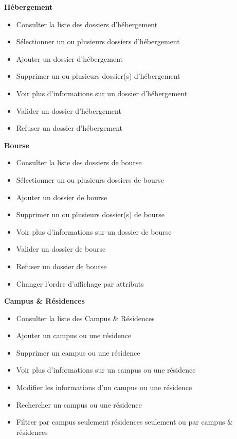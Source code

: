     \textbf{Hébergement}
    \begin{itemize}
        \item Consulter la liste des dossiers d'hébergement
        \item Sélectionner un ou plusieurs dossiers d'hébergement
        \item Ajouter un dossier d'hébergement
        \item Supprimer un ou plusieurs dossier(s) d'hébergement
        \item Voir plus d'informations sur un dossier d'hébergement
        \item Valider un dossier d'hébergement
        \item Refuser un dossier d'hébergement \\
    \end{itemize}

    \textbf{Bourse}
    \begin{itemize}
        \item Consulter la liste des dossiers de bourse
        \item Sélectionner un ou plusieurs dossiers de bourse
        \item Ajouter un dossier de bourse
        \item Supprimer un ou plusieurs dossier(s) de bourse
        \item Voir plus d'informations sur un dossier de bourse
        \item Valider un dossier de bourse
        \item Refuser un dossier de bourse
        \item Changer l'ordre d'affichage par attributs \\
    \end{itemize}

    \textbf{Campus \& Résidences}
    \begin{itemize}
        \item Consulter la liste des Campus \& Résidences
        \item Ajouter un campus ou une résidence
        \item Supprimer un campus ou une résidence
        \item Voir plus d'informations sur un campus ou une résidence
        \item Modifier les informations d'un campus ou une résidence
        \item Rechercher un campus ou une résidence
        \item Filtrer par campus seulement résidences seulement ou par campus \& résidences \\
    \end{itemize}

